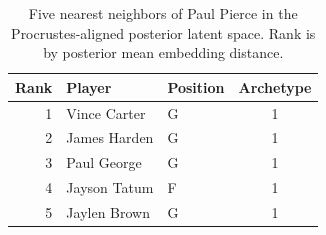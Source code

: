 \begin{table}[htbp]
  \centering\small
  \begin{tabular}{rllc}
    \toprule
    Rank & Player & Position & Archetype \\
    \midrule
    1 & Vince Carter & G & 1 \\
    2 & James Harden & G & 1 \\
    3 & Paul George & G & 1 \\
    4 & Jayson Tatum & F & 1 \\
    5 & Jaylen Brown & G & 1 \\
    \bottomrule
  \end{tabular}
  \caption{Five nearest neighbors of Paul Pierce in the Procrustes-aligned posterior latent space. Rank is by posterior mean embedding distance.}
  \label{tab:Paul_Pierce_neighbors}
\end{table}

